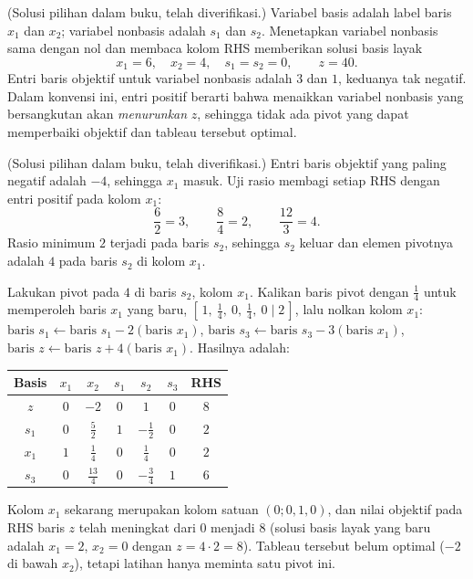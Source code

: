 
(Solusi pilihan dalam buku, telah diverifikasi.) Variabel basis adalah label
baris $x_1$ dan $x_2$; variabel nonbasis adalah $s_1$ dan $s_2$. Menetapkan
variabel nonbasis sama dengan nol dan membaca kolom RHS memberikan solusi basis
layak
\[
x_1 = 6, \quad x_2 = 4, \quad s_1 = s_2 = 0, \qquad z = 40.
\]
Entri baris objektif untuk variabel nonbasis adalah $3$ dan $1$, keduanya tak
negatif. Dalam konvensi ini, entri positif berarti bahwa menaikkan variabel
nonbasis yang bersangkutan akan \emph{menurunkan} $z$, sehingga tidak ada pivot
yang dapat memperbaiki objektif dan tableau tersebut optimal.


(Solusi pilihan dalam buku, telah diverifikasi.) Entri baris objektif yang
paling negatif adalah $-4$, sehingga $x_1$ masuk. Uji rasio membagi setiap RHS
dengan entri positif pada kolom $x_1$:
\[
\frac{6}{2} = 3, \qquad \frac{8}{4} = 2, \qquad \frac{12}{3} = 4.
\]
Rasio minimum $2$ terjadi pada baris $s_2$, sehingga $s_2$ keluar dan elemen
pivotnya adalah $4$ pada baris $s_2$ di kolom $x_1$.


Lakukan pivot pada $4$ di baris $s_2$, kolom $x_1$. Kalikan baris pivot dengan
$\tfrac14$ untuk memperoleh baris $x_1$ yang baru,
$[\,1,\ \tfrac14,\ 0,\ \tfrac14,\ 0 \mid 2\,]$, lalu nolkan kolom $x_1$:
$\text{baris }s_1 \leftarrow \text{baris }s_1 - 2(\text{baris }x_1)$,
$\text{baris }s_3 \leftarrow \text{baris }s_3 - 3(\text{baris }x_1)$,
$\text{baris }z \leftarrow \text{baris }z + 4(\text{baris }x_1)$. Hasilnya adalah:
\begin{center}
\renewcommand{\arraystretch}{1.3}
\begin{tabular}{c|ccccc|c}
Basis & $x_1$ & $x_2$ & $s_1$ & $s_2$ & $s_3$ & RHS\\
\hline
$z$   & $0$ & $-2$ & $0$ & $1$ & $0$ & $8$\\
\hline
$s_1$ & $0$ & $\tfrac52$  & $1$ & $-\tfrac12$ & $0$ & $2$\\
$x_1$ & $1$ & $\tfrac14$  & $0$ & $\tfrac14$  & $0$ & $2$\\
$s_3$ & $0$ & $\tfrac{13}{4}$ & $0$ & $-\tfrac34$ & $1$ & $6$\\
\end{tabular}
\end{center}
Kolom $x_1$ sekarang merupakan kolom satuan $(0; 0, 1, 0)$, dan nilai
objektif pada RHS baris $z$ telah meningkat dari $0$ menjadi $8$ (solusi basis
layak yang baru adalah $x_1 = 2$, $x_2 = 0$ dengan
$z = 4 \cdot 2 = 8$). Tableau tersebut belum optimal ($-2$ di bawah $x_2$),
tetapi latihan hanya meminta satu pivot ini.

